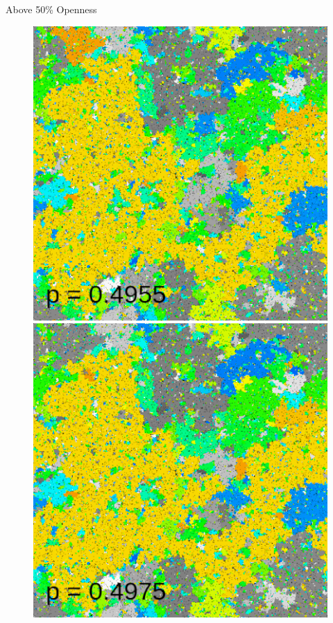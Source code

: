 \documentclass[aspectratio=169, handout]{beamer}
\begin{document}
\begin{frame}{Above 50\% Openness}
\begin{figure}
\centering
\includegraphics[scale=0.22]{percolation-gif/percolation-1-65.png}
\includegraphics[scale=0.22]{percolation-gif/percolation-1-69.png}

\end{figure}
\end{frame}
\end{document}
